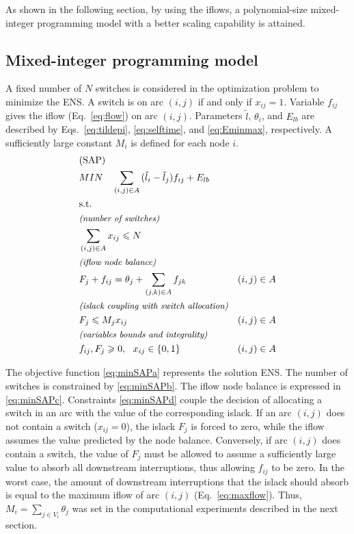 As shown in the following section, by
using the iflows, a polynomial-size mixed-integer programming model with a better scaling capability is attained.



\subsection{Mixed-integer programming model} \label{sec:model}

A fixed number of $N$ switches is considered in the optimization problem to minimize the ENS.
A switch is on arc $(i,j)$ if and only if $x_{ij} = 1$. Variable $f_{ij}$ gives the iflow (Eq.~\ref{eq:flow}) on arc $(i,j)$. Parameters $\tilde{l}$, $\theta_i$, and $E_{lb}$ are described by Eqs.~\eqref{eq:tildepi}, \eqref{eq:selftime}, and \eqref{eq:Eminmax}, respectively. A sufficiently large constant $M_i$ is defined for each node $i$. 
\begin{align}
	& \mbox{(SAP)} & \notag \\
	& MIN \quad \sum_{(i,j) \in A}{(\tilde{l}_i-\tilde{l}_j)f_{ij}}+E_{lb} \label{eq:minSAPa}  \\
	& \mbox{s.t.} & \notag \\
	& \mbox{\textit{\small (number of switches)}} & \notag \\
 	& \sum_{(i,j) \in A}{x_{ij}} \leqslant N & \label{eq:minSAPb}  \\
	& \mbox{\textit{\small (iflow node balance)}} & \notag \\
	& \displaystyle F_j + f_{ij} = \theta_j + \sum_{(j,k) \in A}{f_{jk}} & (i,j) \in A \label{eq:minSAPc} \\
    & \mbox{\textit{\small (islack coupling with switch allocation)}} & \notag \\
    & \displaystyle F_j \leqslant M_jx_{ij} & (i,j) \in A \label{eq:minSAPd} \\
	& \mbox{\textit{\small (variables bounds and integrality)}} & \notag \\
	& f_{ij}, F_{j} \geqslant 0, \ \ x_{ij} \in \left\{0,1\right\} & (i,j) \in A \label{eq:domain1} %
\end{align}

The objective function \eqref{eq:minSAPa} represents the solution ENS. The number of switches is constrained by \eqref{eq:minSAPb}. The iflow node balance is expressed in \eqref{eq:minSAPc}. Constraints \eqref{eq:minSAPd} couple the decision of allocating a switch in an arc with the value of the corresponding islack. If an arc $(i,j)$ does not contain a switch ($x_{ij} = 0$), the islack $F_j$ is forced to zero, while the iflow assumes the value predicted by the node balance. Conversely, if arc $(i,j)$ does contain a switch, the value of $F_j$ must be allowed to assume a sufficiently large value to absorb all downstream interruptions, thus allowing $f_{ij}$ to be zero. In the worst case, the amount of downstream interruptions that the islack should absorb is equal to the maximum iflow of arc $(i,j)$ (Eq.~\eqref{eq:maxflow}). Thus, $\displaystyle M_i = \sum_{j \in V_i}{\theta_j}$ was set in the computational experiments described in the next section.

